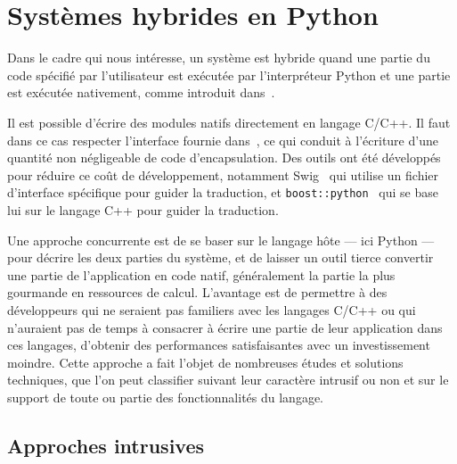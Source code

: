 \documentclass[renpar]{compas2013}
\begin{document}
\section{Systèmes hybrides en Python}\label{sec:python-hybrid}

Dans le cadre qui nous intéresse, un système est hybride quand une partie du
code spécifié par l'utilisateur est exécutée par l'interpréteur Python et une
partie est exécutée nativement, comme introduit dans~\cite{dongara2007}.

Il est possible d'écrire des modules natifs directement en langage C/C++.
Il faut dans ce cas respecter l'interface fournie dans~\cite{pythoncapi},
ce qui conduit à l'écriture d'une quantité non négligeable de code
d'encapsulation. Des outils ont été développés pour réduire ce coût de
développement, notamment Swig~\cite{swig2003} qui utilise un fichier
d'interface spécifique pour guider la traduction, et
\texttt{boost::python}~\cite{boostpython2007} qui se base lui sur le
langage C++ pour guider la traduction.

Une approche concurrente est de se baser sur le langage hôte --- ici
Python --- pour décrire les deux parties du système, et de laisser un
outil tierce convertir une partie de l'application en code natif,
généralement la partie la plus gourmande en ressources de calcul.
L'avantage est de permettre à des développeurs qui ne seraient pas
familiers avec les langages C/C++ ou qui n'auraient pas de temps à
consacrer à écrire une partie de leur application dans ces langages,
d'obtenir des performances satisfaisantes avec un investissement moindre.
Cette approche a fait l'objet de nombreuses études et solutions
techniques, que l'on peut classifier suivant leur caractère intrusif ou
non et sur le support de toute ou partie des fonctionnalités du langage.

\subsection{Approches intrusives}
\end{document}

